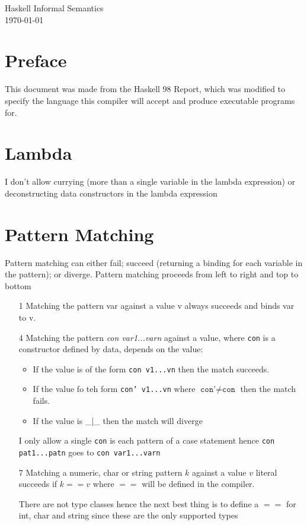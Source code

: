 \documentclass[12pt,a4paper,twoside]{article}
\begin{document}
\begin{center}
  \Large
  Haskell Informal Semantics\\[4mm]
  \today
\end{center}

\section{Preface}

This document was made from the Haskell 98 Report, which was modified to specify the language this compiler will accept and produce executable programs for.

\section{Lambda}

I don't allow currying (more than a single variable in the lambda expression) or deconstructing data constructors in the lambda expression

\section{Pattern Matching}

Pattern matching can either fail; succeed (returning a binding for each variable in the pattern); or diverge. Pattern matching proceeds from left to right and top to bottom

\begin{itemize}
  \item[1] Matching the pattern var against a value v always succeeds and binds var to v.

  \item[4] Matching the pattern \textit{con var1...varn} against a value, where \texttt{con} is a constructor defined by data, depends on the value:
    \begin{itemize}
      \item If the value is of the form \texttt{con v1...vn} then the match succeeds.
      \item If the value fo teh form \texttt{con' v1...vn} where $\texttt{con'} \neq \texttt{con}$ then the match fails.
      \item If the value is \_|\_ then the match will diverge
    \end{itemize}
    I only allow a single \texttt{con} is each pattern of a case statement hence \texttt{con pat1...patn} goes to \texttt{con var1...varn}

  \item[7] Matching a numeric, char or string pattern $k$ against a value $v$ literal succeeds if $k==v$ where $==$ will be defined in the compiler.

    There are not type classes hence the next best thing is to define a $==$ for int, char and string since these are the only supported types
\end{itemize}
\end{document}
